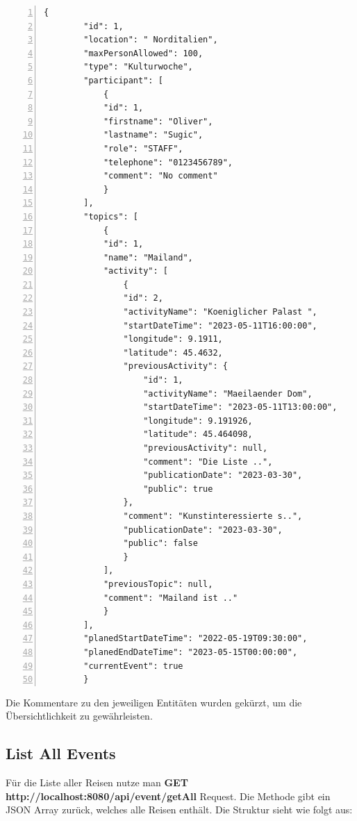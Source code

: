 \begin{lstlisting}[numbers=left, label={lst:json_gte_by_id}]
    {
        "id": 1,
        "location": " Norditalien",
        "maxPersonAllowed": 100,
        "type": "Kulturwoche",
        "participant": [
            {
            "id": 1,
            "firstname": "Oliver",
            "lastname": "Sugic",
            "role": "STAFF",
            "telephone": "0123456789",
            "comment": "No comment"
            }
        ],
        "topics": [
            {
            "id": 1,
            "name": "Mailand",
            "activity": [
                {
                "id": 2,
                "activityName": "Koeniglicher Palast ",
                "startDateTime": "2023-05-11T16:00:00",
                "longitude": 9.1911,
                "latitude": 45.4632,
                "previousActivity": {
                    "id": 1,
                    "activityName": "Maeilaender Dom",
                    "startDateTime": "2023-05-11T13:00:00",
                    "longitude": 9.191926,
                    "latitude": 45.464098,
                    "previousActivity": null,
                    "comment": "Die Liste ..",
                    "publicationDate": "2023-03-30",
                    "public": true
                },
                "comment": "Kunstinteressierte s..",
                "publicationDate": "2023-03-30",
                "public": false
                }
            ],
            "previousTopic": null,
            "comment": "Mailand ist .."
            }
        ],
        "planedStartDateTime": "2022-05-19T09:30:00",
        "planedEndDateTime": "2023-05-15T00:00:00",
        "currentEvent": true
        }
\end{lstlisting}

Die Kommentare zu den jeweiligen Entitäten wurden gekürzt, um die Übersichtlichkeit zu gewährleisten.

\newpage

\subsection{List All Events}

Für die Liste aller Reisen nutze man \textbf{GET http://localhost:8080/api/event/getAll} Request. Die Methode gibt ein JSON Array zurück, welches alle Reisen enthält. Die Struktur sieht wie folgt aus:

